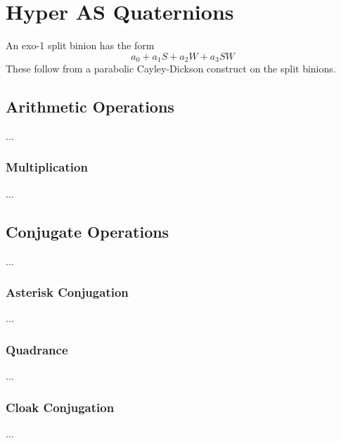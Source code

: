 \chapter{Hyper AS Quaternions}
An exo-1 split binion has the form
\begin{equation}
    a_{0} + a_{1} S + a_{2} W + a_{3} SW
\end{equation}
These follow from a parabolic Cayley-Dickson construct on the split binions.
\section{Arithmetic Operations}
...
\subsection{Multiplication}
...
\section{Conjugate Operations}
...
\subsection{Asterisk Conjugation}
...
\subsection{Quadrance}
...
\subsection{Cloak Conjugation}
...
